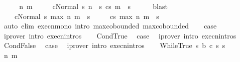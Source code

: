 \begin{isabellebody}
\ \ \isamarkupfalse%
\ \isamarkupfalse%
\ n\ m\ \isanewline
\ \ \ \ {\isachardoublequoteopen}{\isasymGamma}{\isasymturnstile}{\isasymlangle}c{}{\isacharcomma}Normal\ s{\isasymrangle}\ {\isacharequal}n{\isasymRightarrow}\ \ s{\isacharprime}{\isachardoublequoteclose}\ {\isachardoublequoteopen}{\isasymGamma}{\isasymturnstile}{\isasymlangle}c{}{\isacharcomma}s{\isacharprime}{\isasymrangle}\ {\isacharequal}m{\isasymRightarrow}\ \ s{\isacharprime}{\isacharprime}{\isachardoublequoteclose}\isanewline
\ \ \ \ \isamarkupfalse%
\ blast\isanewline
\ \ \isamarkupfalse%
\ \isamarkupfalse%
\ \isanewline
\ \ \ \ {\isachardoublequoteopen}{\isasymGamma}{\isasymturnstile}{\isasymlangle}c{}{\isacharcomma}Normal\ s{\isasymrangle}\ {\isacharequal}max\ n\ m{\isasymRightarrow}\ \ s{\isacharprime}{\isachardoublequoteclose}\ \isanewline
\ \ \ \ {\isachardoublequoteopen}{\isasymGamma}{\isasymturnstile}{\isasymlangle}c{}{\isacharcomma}s{\isacharprime}{\isasymrangle}\ {\isacharequal}max\ n\ m{\isasymRightarrow}\ \ s{\isacharprime}{\isacharprime}{\isachardoublequoteclose}\isanewline
\ \ \ \ \isamarkupfalse%
\ {\isacharparenleft}auto\ elim{\isacharbang}{\isacharcolon}\ execn{\isacharunderscore}mono\ intro{\isacharcolon}\ max{\isachardot}cobounded{}\ max{\isachardot}cobounded{}{\isacharparenright}\isanewline
\ \ \isamarkupfalse%
\ {\isacharquery}case\ \isanewline
\ \ \ \ \isamarkupfalse%
\ {\isacharparenleft}iprover\ intro{\isacharcolon}\ execn{\isachardot}intros{\isacharparenright}\isanewline
{}\isamarkupfalse%
\isanewline
\ \ \isamarkupfalse%
\ CondTrue\ \isamarkupfalse%
\ {\isacharquery}case\ \isamarkupfalse%
\ {\isacharparenleft}iprover\ intro{\isacharcolon}\ execn{\isachardot}intros{\isacharparenright}\isanewline
{}\isamarkupfalse%
\isanewline
\ \ \isamarkupfalse%
\ CondFalse\ \isamarkupfalse%
\ {\isacharquery}case\ \isamarkupfalse%
\ {\isacharparenleft}iprover\ intro{\isacharcolon}\ execn{\isachardot}intros{\isacharparenright}\isanewline
{}\isamarkupfalse%
\isanewline
\ \ \isamarkupfalse%
\ {\isacharparenleft}WhileTrue\ s\ b\ c\ s{\isacharprime}\ s{\isacharprime}{\isacharprime}{\isacharparenright}\ \isanewline
\ \ \isamarkupfalse%
\ \isamarkupfalse%
\ n\ m\ \isanewline

\end{isabellebody}
